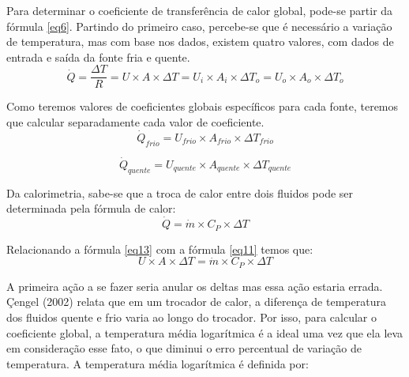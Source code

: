 \documentclass[a4paper,12pt,oneside]{article}
\begin{document}
\begin{flushright}
Para determinar o coeficiente de transferência de calor global, pode-se partir da fórmula \ref{eq6}. Partindo do primeiro caso, percebe-se que é necessário a variação de temperatura, mas com base nos dados, existem quatro valores, com dados de entrada e saída da fonte fria e quente.\\

\begin{equation}\label{eq24}
\dot{Q} = \frac{\Delta T}{R} = U \times A \times \Delta T = U_{i} \times A_{i} \times \Delta T_{o} = U_{o} \times A_{o} \times \Delta T_{o}
\end{equation}
\vspace{0.5cm}

Como teremos valores de coeficientes globais específicos para cada fonte, teremos que calcular separadamente cada valor de coeficiente.\\

\begin{equation}\label{eq25}
\dot{Q}_{frio} = U_{frio} \times A_{frio} \times \Delta T_{frio} 
\end{equation}
\vspace{0.5cm}

\begin{equation}\label{eq27}
\dot{Q}_{quente} = U_{quente} \times A_{quente} \times \Delta T_{quente} 
\end{equation}
\vspace{0.5cm}

Da calorimetria, sabe-se que a troca de calor entre dois fluidos pode ser determinada pela fórmula de calor:\\

\begin{equation}\label{eq28}
\dot{Q} = \dot{m} \times C_{P} \times \Delta T
\end{equation}
\vspace{0.5cm}

Relacionando a fórmula \ref{eq13} com a fórmula \ref{eq11} temos que:\\

\begin{equation}\label{eq29}
U \times A \times \Delta T = \dot{m} \times C_{P} \times \Delta T
\end{equation}
\vspace{0.5cm}

A primeira ação a se fazer seria anular os deltas mas essa ação estaria errada. Çengel (2002) relata que em um trocador de calor, a diferença de temperatura dos fluidos quente e frio varia ao longo do trocador. Por isso, para calcular o coeficiente global, a temperatura média logarítmica é a ideal uma vez que ela leva em consideração esse fato, o que diminui o erro percentual de variação de temperatura. A temperatura média logarítmica é definida por:\\


\end{flushright}
\end{document}
